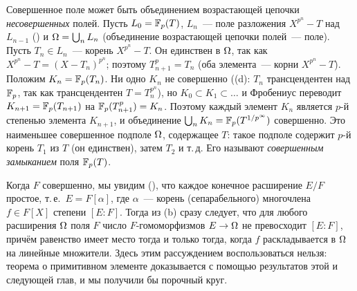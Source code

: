 \begin{example}[2.25b]
Совершенное поле может быть объединением возрастающей цепочки \emph{несовершенных} полей. Пусть $L_0=\mathbb F_p(T)$,
$L_n$~--- поле разложения $X^{p^n}-T$ над $L_{n-1}$ () и $\Omega=\bigcup_nL_n$ (объединение возрастающей цепочки
полей~--- поле). Пусть $T_n\in L_n$~--- корень $X^{p^n}-T$. Он единствен в $\Omega$, так как $X^{p^n}-T=(X-T_n)^{p^n}$;
поэтому $T_{n+1}^p=T_n$ (оба элемента~--- корни $X^{p^n}-T$). Положим $K_n=\mathbb F_p(T_n)$. Ни одно $K_n$ не совершенно
((d): $T_n$ трансцендентен над $\mathbb F_p$, так как трансцендентен $T=T_n^{p^n}$), но $K_0\subset K_1\subset\dots$ и
Фробениус переводит $K_{n+1}=\mathbb F_p(T_{n+1})$ на $\mathbb F_p(T_{n+1}^p)=K_n$. Поэтому каждый элемент $K_n$ является $p$-й
степенью элемента $K_{n+1}$, и объединение $\bigcup_nK_n=\mathbb F_p(T^{1/p^\infty})$ совершенно. Это наименьшее совершенное
подполе $\Omega$, содержащее $T$: такое подполе содержит $p$-й корень $T_1$ из $T$ (он единствен), затем $T_2$ и т.\,д.
Его называют \emph{совершенным замыканием} поля $\mathbb F_p(T)$.
\end{example}

\begin{aside}[2.26]
Когда $F$ совершенно, мы увидим (), что каждое конечное расширение $E/F$ простое, т.\,е.\ $E=F[\alpha]$, где
$\alpha$~--- корень (сепарабельного) многочлена $f\in F[X]$ степени $[E:F]$. Тогда из (b) сразу следует, что для
любого расширения $\Omega$ поля $F$ число $F$-гомоморфизмов $E\to\Omega$ не превосходит $[E:F]$, причём равенство имеет место
тогда и только тогда, когда $f$ раскладывается в $\Omega$ на линейные множители. Здесь этим рассуждением воспользоваться
нельзя: теорема о примитивном элементе  доказывается с помощью результатов этой и следующей глав, и мы получили
бы порочный круг.
\end{aside}

